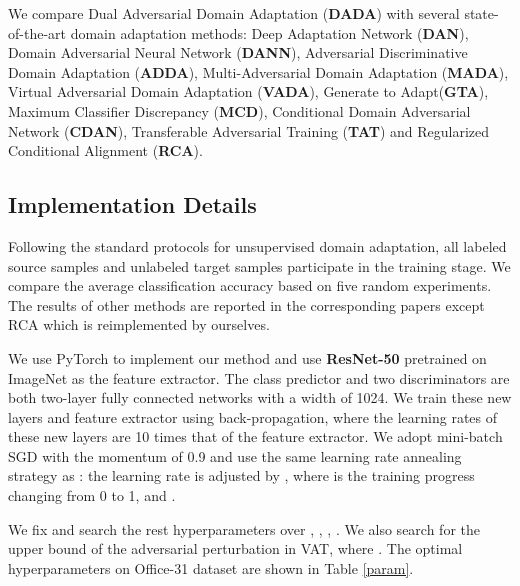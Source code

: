 \documentclass{ecai}
\begin{document}
We compare Dual Adversarial Domain Adaptation (\textbf{DADA}) with several state-of-the-art domain adaptation methods: Deep Adaptation Network (\textbf{DAN})\cite{b9}, Domain Adversarial Neural Network (\textbf{DANN})\cite{b18}, Adversarial Discriminative Domain Adaptation (\textbf{ADDA})\cite{b33}, Multi-Adversarial Domain Adaptation (\textbf{MADA})\cite{b13}, Virtual Adversarial Domain Adaptation (\textbf{VADA})\cite{b40}, Generate to Adapt(\textbf{GTA})\cite{b39}, Maximum Classifier Discrepancy (\textbf{MCD})\cite{b24}, Conditional Domain Adversarial Network (\textbf{CDAN})\cite{b34}, Transferable Adversarial Training (\textbf{TAT})\cite{b35} and Regularized Conditional Alignment (\textbf{RCA})\cite{b17}.



\subsection{Implementation Details}

Following the standard protocols for unsupervised domain adaptation\cite{b18,b10}, all labeled source samples and unlabeled target samples participate in the training stage. We compare the average classification accuracy based on five random experiments. The results of other methods are reported in the corresponding papers except RCA which is reimplemented by ourselves.


We use PyTorch to implement our method and use \textbf{ResNet-50}\cite{b36} pretrained on ImageNet\cite{b38} as the feature extractor. The class predictor and two discriminators are both two-layer fully connected networks with a width of 1024. We train these new layers and feature extractor using back-propagation, where the learning rates of these new layers are 10 times that of the feature extractor. We adopt mini-batch SGD with the momentum of 0.9 and use the same learning rate annealing strategy as \cite{b18}: the learning rate is adjusted by , where  is the training progress changing from 0 to 1, and .



We fix  and search the rest hyperparameters over , , , . We also search for the upper bound of the adversarial perturbation in VAT, where . The optimal hyperparameters on Office-31 dataset are shown in Table \ref{param}.
\end{document}
